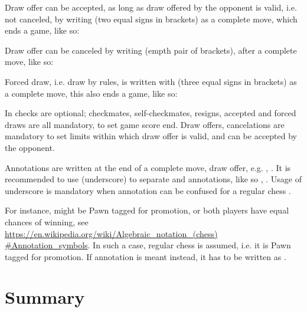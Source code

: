 \algcycpar
{}
\algcycparend

Draw offer can be accepted, as long as draw offered by the opponent is valid, i.e. not
canceled, by writing \alg{(==)} (two equal signs in brackets) as a complete move, which
ends a game, like so:

\algcycpar
{}
\algcycparend

Draw offer can be canceled by writing \alg{()} (empth pair of brackets), after a complete
move, like so:

\algcycpar
{}
\algcycparend

Forced draw, i.e. draw by rules, is written with \alg{(===)} (three equal signs in
brackets) as a complete move, this also ends a game, like so:

\algcycpar
{}
\algcycparend

In  checks are optional; checkmates, self-checkmates, resigns, accepted
and forced draws are all mandatory, to set game score end. Draw offers, cancelations
are mandatory to set limits within which draw offer is valid, and can be accepted by
the opponent.

Annotations are written at the end of a complete move, draw offer, e.g. ,
. It is recommended to use \alg{\_} (underscore) to separate 
and annotations, like so , . Usage of underscore is
mandatory when annotation can be confused for a regular chess .

For instance,  might be Pawn tagged for promotion, or both players have equal
chances of winning, see\newline
\href{https://en.wikipedia.org/wiki/Algebraic\_notation\_(chess)#Annotation\_symbols}
{https://en.wikipedia.org/wiki/Algebraic\_notation\_(chess)\newline
\#Annotation\_symbols}. In such a case, regular chess  is assumed, i.e. it
is Pawn tagged for promotion. If annotation is meant instead, it has to be written as
.

\clearpage %

\section*{Summary}
\label{sec:Appendix/Summary}

